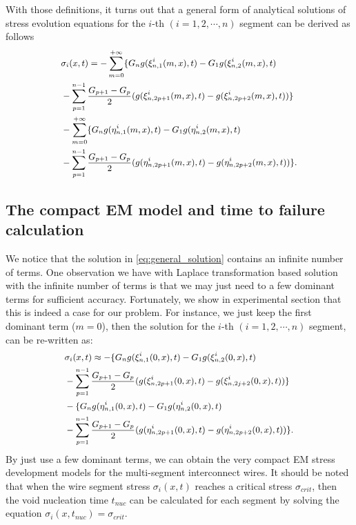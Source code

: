 With those definitions, it turns out that a general form of analytical
solutions of stress evolution equations for the $i$-th
$(i=1,2,\cdots,n)$ segment can be derived as follows
\begin{equation} \label{eq:general_solution}\small
\begin{split}
&\sigma_{i}(x,t)=-\sum\limits_{m=0}^{+\infty}\{G_ng(\xi_{n,1}^{i}(m,x),t)-G_1g(\xi_{n,2}^{i}(m,x),t)\\
&-\sum\limits_{p=1}^{n-1}\frac{G_{p+1}-G_p}{2}(g(\xi_{n,2p+1}^{i}(m,x),t)-g(\xi_{n,2p+2}^{i}(m,x),t))\}\\
&-\sum\limits_{m=0}^{+\infty}\{G_ng(\eta_{n,1}^{i}(m,x),t)-G_1g(\eta_{n,2}^{i}(m,x),t)\\
&-\sum\limits_{p=1}^{n-1}\frac{G_{p+1}-G_p}{2}(g(\eta_{n,2p+1}^{i}(m,x),t)-g(\eta_{n,2p+2}^{i}(m,x),t))\}.
 \end{split}
 \end{equation}

\subsection{The compact EM model and time to failure calculation}
 We notice that the solution in \eqref{eq:general_solution} contains
 an infinite number of terms. One observation we have with Laplace
 transformation based solution with the infinite number of terms is that
 we may just need to a few dominant terms for sufficient accuracy.
 Fortunately, we show in experimental section that this is indeed a
 case for our problem. For instance, we just keep the first dominant
 term ($m=0$), then the solution for the $i$-th $(i=1,2,\cdots,n)$
 segment, can be re-written as:
\begin{equation} \label{eq:approximate_solution}\small
\begin{split}
&\sigma_{i}(x,t)\approx-\{G_ng(\xi_{n,1}^{i}(0,x),t)-G_1g(\xi_{n,2}^{i}(0,x),t)\\
&-\sum\limits_{p=1}^{n-1}\frac{G_{p+1}-G_p}{2}(g(\xi_{n,2p+1}^{i}(0,x),t)-g(\xi_{n,2j+2}^{i}(0,x),t))\}\\
&-\{G_ng(\eta_{n,1}^{i}(0,x),t)-G_1g(\eta_{n,2}^{i}(0,x),t)\\
&-\sum\limits_{p=1}^{n-1}\frac{G_{p+1}-G_p}{2}(g(\eta_{n,2p+1}^{i}(0,x),t)-g(\eta_{n,2p+2}^{i}(0,x),t))\}.
 \end{split}
 \end{equation}
 By just use a few dominant terms, we can obtain the very compact EM
 stress development models for the multi-segment interconnect wires.
 It should be noted that when the wire segment stress
 $\sigma_{i}(x,t)$ reaches a critical stress $\sigma_{crit}$, then the
 void nucleation time $t_{nuc}$ can be calculated for each segment by
 solving the equation $\sigma_{i}(x,t_{nuc})=\sigma_{crit}$.
 
